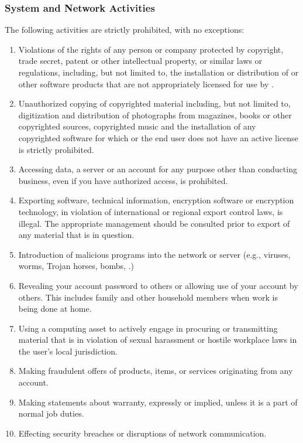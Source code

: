 \subsubsection{System and Network Activities }
The following activities are strictly prohibited, with no exceptions:
\begin{enumerate}
\item
Violations of the rights of any person or company protected by copyright, trade secret, patent or other intellectual property, or similar laws or regulations, including, but not limited to, the installation or distribution of  or other software products that are not appropriately licensed for use by \CompanyName{}.
\item
Unauthorized copying of copyrighted material including, but not limited to, digitization and distribution of photographs from magazines, books or other copyrighted sources, copyrighted music\oxford{} and the installation of any copyrighted software for which \CompanyName{} or the end user does not have an active license is strictly prohibited.
\item
Accessing data, a server or an account for any purpose other than conducting \CompanyName{} business, even if you have authorized access, is prohibited.
\item
Exporting software, technical information, encryption software\oxford{} or encryption technology, in violation of international or regional export control laws, is illegal.  
The appropriate management should be consulted prior to export of any material that is in question.
\item
Introduction of malicious programs into the network or server (e.g., viruses, worms, Trojan horses, \email{} bombs, \etc{}.)
\item
Revealing your account password to others or allowing use of your account by others.  
This includes family and other household members when work is being done at home.
\item
Using a \CompanyName{} computing asset to actively engage in procuring or transmitting material that is in violation of sexual harassment or hostile workplace laws in the user's local jurisdiction.
\item
Making fraudulent offers of products, items, or services originating from any \CompanyName{} account.
\item
Making statements about warranty, expressly or implied, unless it is a part of normal job duties.
\item
Effecting security breaches or disruptions of network communication.  

\end{enumerate}
